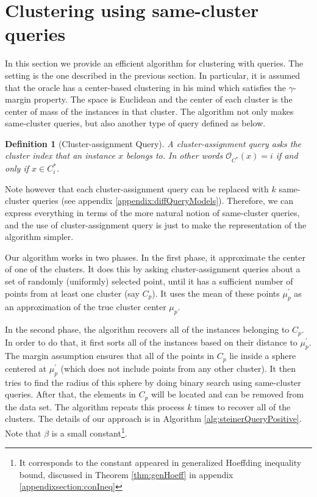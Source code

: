 \documentclass[12pt]{article}
\newcommand{\mc}{\mathcal}
\newtheorem{definition}[theorem]{Definition}
\begin{document}
\section{Clustering using same-cluster queries}
\label{section:clusteringWithQuery}

In this section we provide an efficient algorithm for clustering with queries. The setting is the one described in the previous section. In particular, it is assumed that the oracle has a center-based clustering in his mind which satisfies the $\gamma$-margin property. The space is Euclidean and the center of each cluster is the center of mass of the instances in that cluster. The algorithm not only makes same-cluster queries, but also another type of query defined as below.%


\begin{definition}[Cluster-assignment Query]
A cluster-assignment query asks the cluster index that an instance $x$ belongs to. In other words ${\mc O_{C^*}}(x) = i$ if and only if $x \in C^*_i$.
\end{definition}

Note however that each cluster-assignment query can be replaced with $k$ same-cluster queries (see appendix \ref{appendix:diffQueryModels}). Therefore, we can express everything in terms of the more natural notion of same-cluster queries, and the use of cluster-assignment query is just to make the representation of the algorithm simpler.

Our algorithm works in two phases. In the first phase, it approximate the center of one of the clusters. It does this by asking cluster-assignment queries about a set of randomly (uniformly) selected point, until it has a sufficient number of points from at least one cluster (say $C_p$). It uses the mean of these points $\mu_p^\prime$ as an approximation of the true cluster center $\mu_p$. 

In the second phase, the algorithm recovers all of the instances belonging to $C_p$. In order to do that, it first sorts all of the instances based on their distance to $\mu_p^\prime$. The margin assumption ensures that all of the points in $C_p$ lie inside a sphere centered at $\mu_p^\prime$ (which does not include points from any other cluster). It then tries to find the radius of this sphere by doing binary search using same-cluster queries. After that, the elements in $C_p$ will be located and can be removed from the data set. The algorithm repeats this process $k$ times to recover all of the clusters. The details of our approach is in Algorithm \ref{alg:steinerQueryPositive}. Note that $\beta$ is a small constant\footnote{It corresponds to the constant appeared in generalized Hoeffding inequality bound, discussed in Theorem \ref{thm:genHoeff} in appendix \ref{appendixsection:conIneq} }. 
\end{document}
